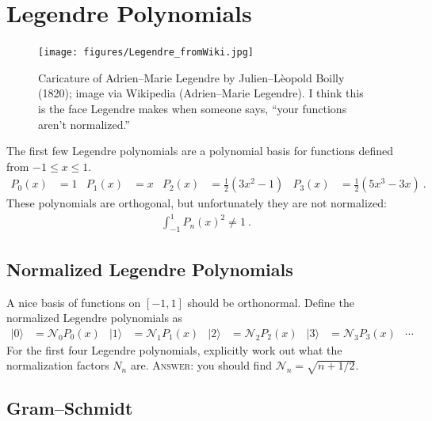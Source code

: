 \documentclass[12pt]{article}
\numberwithin{equation}{section}    %
\begin{document}
\section{Legendre Polynomials}

\begin{figure}[h]
\centering
\texttt{[image: figures/Legendre\_fromWiki.jpg]}
\caption{Caricature of Adrien--Marie Legendre by Julien--L\`eopold Boilly (1820); image via Wikipedia (Adrien--Marie Legendre). I think this is the face Legendre makes when someone says, ``your functions aren't normalized.''}
\end{figure}

The first few Legendre polynomials are a polynomial basis for functions defined from $-1\leq x \leq 1$.
\begin{align}
	P_0(x) &= 1 
	& 
	P_1(x) &= x
	&
	P_2(x) &= \frac{1}{2}\left(3x^2-1\right)
	&
	P_3(x) &= \frac{1}{2}\left(5x^3 - 3x\right) \ .
\end{align}
These polynomials are orthogonal, but unfortunately they are not normalized:
\begin{align}
	\int_{-1}^1 P_n(x)^2 \neq 1 \ .
\end{align}
\subsection{Normalized Legendre Polynomials}

A nice basis of functions on $[-1,1]$ should be orthonormal. Define the normalized Legendre polynomials as
\begin{align}
	|0\rangle &= 
	\mathcal N_0
	P_0(x)
	& 
	|1\rangle &= 
	\mathcal N_1
	P_1(x)
	&
	|2\rangle &= 
	\mathcal N_2
	P_2(x)
	&
	|3\rangle &= 
	\mathcal N_3
	P_3(x)
	& \cdots
\end{align}
For the first four Legendre polynomials, explicitly work out what the normalization factors $N_n$ are. \textsc{Answer:} you should find $\mathcal N_n = \sqrt{n+1/2}$.

\subsection{Gram--Schmidt}
\end{document}
